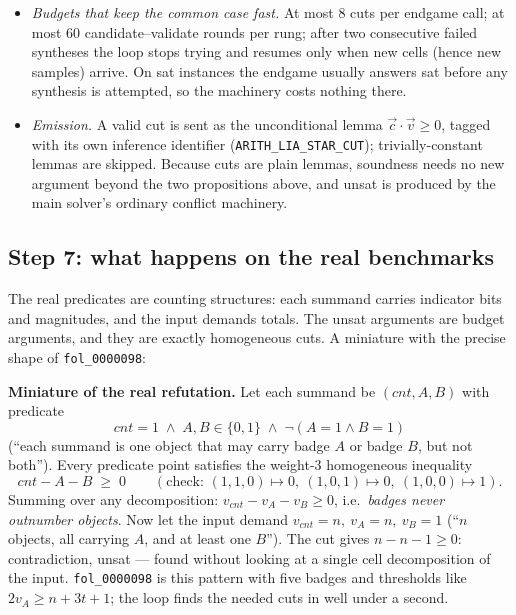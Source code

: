 \documentclass[11pt]{article}
\newcommand{\vv}{\ensuremath{\vec{v}}\xspace}
\newcommand{\vc}{\ensuremath{\vec{c}}\xspace}
\begin{document}
\begin{itemize}
\item \emph{Budgets that keep the common case fast.} At most 8 cuts per
  endgame call; at most 60 candidate--validate rounds per rung; after two
  consecutive failed syntheses the loop stops trying and resumes only
  when new cells (hence new samples) arrive. On \textsf{sat} instances
  the endgame usually answers \textsf{sat} before any synthesis is
  attempted, so the machinery costs nothing there.
\item \emph{Emission.} A valid cut is sent as the unconditional lemma
  $\vc \cdot \vv \ge 0$, tagged with its own inference identifier
  (\texttt{ARITH\_LIA\_STAR\_CUT}); trivially-constant lemmas are
  skipped.
  Because cuts are plain lemmas, soundness needs no new argument beyond
  the two propositions above, and \textsf{unsat} is produced by the main
  solver's ordinary conflict machinery.
\end{itemize}

\subsection{Step 7: what happens on the real benchmarks}

The real predicates are counting structures: each summand carries
indicator bits and magnitudes, and the input demands totals. The
\textsf{unsat} arguments are budget arguments, and they are exactly
homogeneous cuts. A miniature with the precise shape of
\texttt{fol\_0000098}:

\begin{exbox}
\textbf{Miniature of the real refutation.} Let each summand be
$(\mathit{cnt}, A, B)$ with predicate
\[
\mathit{cnt} = 1 \;\wedge\; A,B \in \{0,1\} \;\wedge\; \neg(A = 1 \wedge B = 1)
\]
(``each summand is one object that may carry badge $A$ or badge $B$, but
not both''). Every predicate point satisfies the weight-3 homogeneous
inequality
\[
\mathit{cnt} - A - B \;\ge\; 0
\qquad (\text{check: } (1,1,0) \mapsto 0,\ (1,0,1) \mapsto 0,\ (1,0,0) \mapsto 1).
\]
Summing over any decomposition: $v_{\mathit{cnt}} - v_A - v_B \ge 0$,
i.e.\ \emph{badges never outnumber objects}. Now let the input demand
$v_{\mathit{cnt}} = n,\ v_A = n,\ v_B = 1$ (``$n$ objects, all carrying
$A$, and at least one $B$''). The cut gives $n - n - 1 \ge 0$:
contradiction, \textsf{unsat} --- found without looking at a single cell
decomposition of the input. \texttt{fol\_0000098} is this pattern with
five badges and thresholds like $2 v_A \ge n + 3t + 1$; the loop finds
the needed cuts in well under a second.
\end{exbox}
\end{document}
